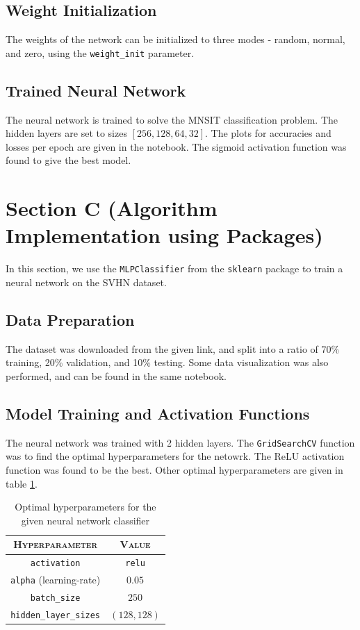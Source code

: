 \documentclass[12pt]{article}
\begin{document}
    \subsection*{Weight Initialization}
    The weights of the network can be initialized to three modes - random, normal, and zero,
    using the \texttt{weight\_init} parameter.

    \subsection*{Trained Neural Network}
    The neural network is trained to solve the MNSIT classification problem. The hidden layers are
    set to sizes $[256, 128, 64, 32]$. The plots for accuracies and losses per epoch are
    given in the notebook. The sigmoid activation function was found to give the best model.

    \section{Section C (Algorithm Implementation using Packages)}
    In this section, we use the \texttt{MLPClassifier} from the \texttt{sklearn} package to
    train a neural network on the SVHN dataset.

    \subsection*{Data Preparation}
    The dataset was downloaded from the given link, and split into a ratio of 70\% training,
    20\% validation, and 10\% testing. Some data visualization was also performed, and can be found
    in the same notebook.

    \subsection*{Model Training and Activation Functions}
    The neural network was trained with 2 hidden layers. The \texttt{GridSearchCV} function was
    to find the optimal hyperparameters for the netowrk. The ReLU activation function was found
    to be the best. Other optimal hyperparameters are given in table \ref{tab:hyperparams}.
    \begin{table}[htbp]
        \centering
        \begin{tabular}{c|c}
            \textsc{Hyperparameter} & \textsc{Value} \\
            \hline
            \texttt{activation} & \texttt{relu} \\
            \texttt{alpha} (learning-rate) & $0.05$ \\
            \texttt{batch\_size} & $250$ \\
            \texttt{hidden\_layer\_sizes} & $(128, 128)$
        \end{tabular}
        \caption{Optimal hyperparameters for the given neural network classifier}
        \label{tab:hyperparams}
    \end{table}
\end{document}
